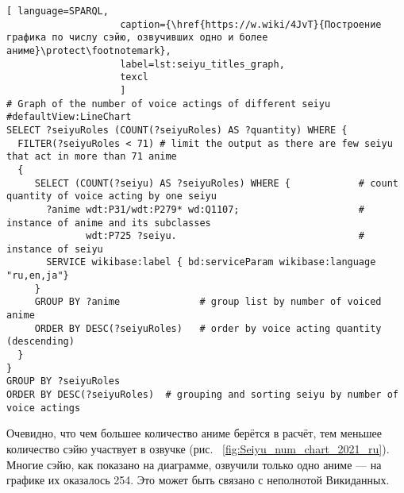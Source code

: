 \begin{fullwidth}
\lstset{numbers=left, firstnumber=1, frame=single}
\begin{lstlisting}[ language=SPARQL, 
                    caption={\href{https://w.wiki/4JvT}{Построение графика по числу сэйю, озвучивших одно и более аниме}\protect\footnotemark},
                    label=lst:seiyu_titles_graph,
                    texcl 
                    ]
# Graph of the number of voice actings of different seiyu
#defaultView:LineChart
SELECT ?seiyuRoles (COUNT(?seiyuRoles) AS ?quantity) WHERE {
  FILTER(?seiyuRoles < 71) # limit the output as there are few seiyu that act in more than 71 anime
  {
     SELECT (COUNT(?seiyu) AS ?seiyuRoles) WHERE {            # count quantity of voice acting by one seiyu
       ?anime wdt:P31/wdt:P279* wd:Q1107;                     # instance of anime and its subclasses
              wdt:P725 ?seiyu.                                # instance of seiyu
       SERVICE wikibase:label { bd:serviceParam wikibase:language "ru,en,ja"}
     }
     GROUP BY ?anime              # group list by number of voiced anime
     ORDER BY DESC(?seiyuRoles)   # order by voice acting quantity (descending)
  }
}
GROUP BY ?seiyuRoles
ORDER BY DESC(?seiyuRoles)  # grouping and sorting seiyu by number of voice actings
\end{lstlisting}%
\lstset{numbers=none}
\end{fullwidth}

Очевидно, что чем большее количество аниме берётся в расчёт, тем меньшее количество сэйю участвует в озвучке (рис. ~\ref{fig:Seiyu_num_chart_2021_ru}). Многие сэйю, как показано на диаграмме, озвучили только одно аниме — на графике их оказалось 254. Это может быть связано с неполнотой Викиданных. 

\begin{figure*}[h]

    \setlength{\fboxsep}{0pt}%
    \setlength{\fboxrule}{1pt}%
	\caption[График, который показывает число ролей, озвученных различными сэйю, 2021.]{График, который показывает число ролей, озвученных различными сэйю, 2021. График построена на основе данных, полученных с помощью запроса~\protect\ref{lst:seiyu_titles_graph}.}%
    \label{fig:Seiyu_num_chart_2021_ru}%
\end{figure*} 

